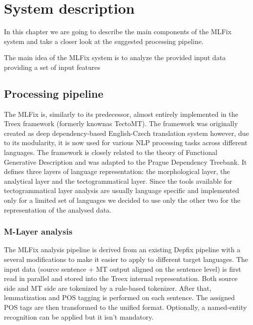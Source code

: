 \chapter{System description}

In this chapter we are going to describe the main components
of the MLFix system and take a closer look at the suggested processing pipeline.

The main idea of the MLFix system is to analyze the provided input data providing
a set of input features 

\section{Processing pipeline}

The MLFix is, similarly to its predecessor, almost entirely implemented in the
Treex\cite{Popel:2010:TMN:1884371.1884406}
framework (formerly knownas TectoMT). The framework was
originally created as deep dependency-based English-Czech
translation system however, due to its modularity, it is
now used for various NLP processing tasks across different
languages. The framework is closely related to the theory of Functional Generative Description\cite{Sgall1967}
and was adapted to the Prague Dependency Treebank\cite{pdt20:2006}.
It defines three layers of language representation: the morphological layer, the analytical layer
and the tectogrammatical layer.
Since the tools available for tectogrammatical layer analysis are usually
language specific and implemented only for a limited set of languages
we decided to use only the other two for the representation
of the analysed data.

\subsection{M-Layer analysis}

The MLFix analysis pipeline is derived from an existing Depfix pipeline
with a several modifications to make it easier to apply to different
target languages. The input data (source sentence + MT output aligned on the sentence level)
is first read in parallel and stored into the Treex internal representation.
Both source side and MT side are tokenized by a rule-based tokenizer. After
that, lemmatization and POS tagging is performed on each sentence. The
assigned POS tags are then transformed to the unified format. Optionally,
a named-entity recognition can be applied but it isn't mandatory.

